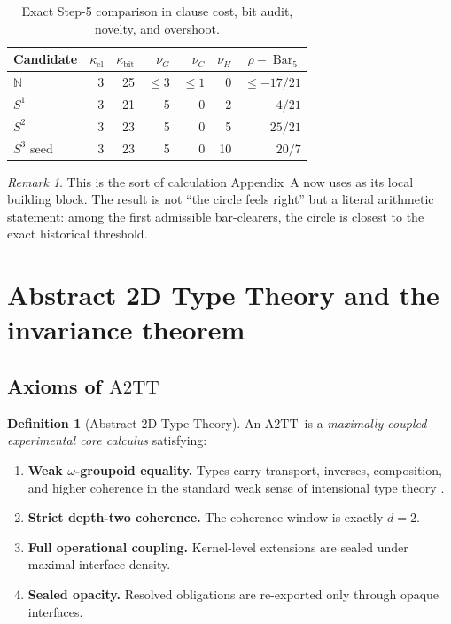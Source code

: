 \documentclass{lmcs}
\theoremstyle{plain}
\theoremstyle{definition}
\newtheorem{defi}[thm]{Definition}
\theoremstyle{remark}
\newtheorem{rem}[thm]{Remark}
\newcommand{\N}{\ensuremath{\mathbb{N}}}
\newcommand{\ATwo}{\ensuremath{\mathrm{A2TT}}}
\newcommand{\SelBar}{\ensuremath{\operatorname{Bar}}}
\begin{document}
\begin{table}[tbp]
\centering
\caption{Exact Step-5 comparison in clause cost, bit audit, novelty, and overshoot.}
\label{tab:step5}
\small
\begin{tabular}{@{}lrrrrrr@{}}
\toprule
Candidate & $\kappa_{\mathrm{cl}}$ & $\kappa_{\mathrm{bit}}$ & $\nu_G$ & $\nu_C$ & $\nu_H$ & $\rho-\SelBar_5$ \\
\midrule
$\N$                     & 3 & 25 & $\le 3$ & $\le 1$ & 0 & $\le -17/21$ \\
$S^1$                    & 3 & 21 & 5 & 0 & 2 & $4/21$ \\
$S^2$                    & 3 & 23 & 5 & 0 & 5 & $25/21$ \\
$S^3$ seed               & 3 & 23 & 5 & 0 & 10 & $20/7$ \\
\bottomrule
\end{tabular}
\end{table}

\begin{rem}
This is the sort of calculation Appendix~A now uses as its local building block.
The result is not ``the circle feels right'' but a literal arithmetic statement: among the first admissible bar-clearers, the circle is closest to the exact historical threshold.
\end{rem}

\section{Abstract 2D Type Theory and the invariance theorem}
\label{sec:a2tt}

\subsection{Axioms of \ATwo}

\begin{defi}[Abstract 2D Type Theory]
An \ATwo\ is a \emph{maximally coupled experimental core calculus} satisfying:
\begin{enumerate}[label=(\arabic*),nosep]
  \item \textbf{Weak $\omega$-groupoid equality.} Types carry transport, inverses, composition, and higher coherence in the standard weak sense of intensional type theory \cite{lumsdaine,vdberg-garner}.
  \item \textbf{Strict depth-two coherence.} The coherence window is exactly $d=2$.
  \item \textbf{Full operational coupling.} Kernel-level extensions are sealed under maximal interface density.
  \item \textbf{Sealed opacity.} Resolved obligations are re-exported only through opaque interfaces.
\end{enumerate}
\end{defi}
\end{document}
